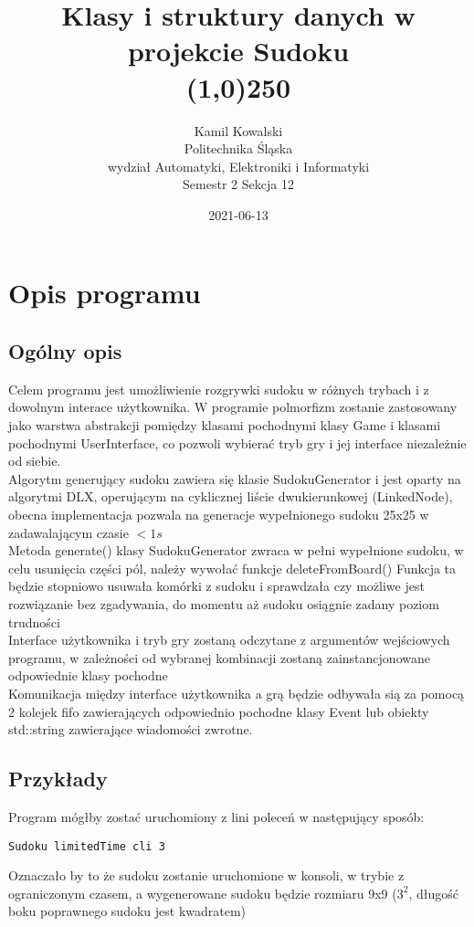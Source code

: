 \let\mypdfximage\pdfximage\def\pdfximage{\immediate\mypdfximage}\documentclass[a4paper,12pt]{book}
\title{Klasy i struktury danych w projekcie Sudoku\\ \line(1,0){250}}
\date{2021-06-13}
\author{Kamil Kowalski\\
Politechnika Śląska \\wydział Automatyki, Elektroniki i Informatyki \\ Semestr 2 Sekcja 12}
\newcommand{\+}{\discretionary{\mbox{\scriptsize$\hookleftarrow$}}{}{}}
\begin{document}
\raggedbottom

\maketitle


\chapter{Opis programu}
\section{Ogólny opis}
Celem programu jest umożliwienie rozgrywki sudoku w różnych trybach i z dowolnym interace użytkownika. 
W programie polmorfizm zostanie zastosowany jako warstwa abstrakcji pomiędzy klasami pochodnymi klasy Game i
klasami pochodnymi UserInterface, co pozwoli wybierać tryb gry i jej interface niezależnie od siebie.\\
Algorytm generujący sudoku zawiera się klasie SudokuGenerator i jest oparty na algorytmi DLX, operującym na cyklicznej liście dwukierunkowej (LinkedNode), obecna implementacja pozwala na generacje wypełnionego sudoku 25x25
w zadawalającym czasie $< 1s$ \\
Metoda generate() klasy SudokuGenerator zwraca w pełni wypełnione sudoku, w celu usunięcia części pól, należy wywołać funkcje deleteFromBoard()
Funkcja ta będzie stopniowo usuwała komórki z sudoku i sprawdzała czy możliwe jest rozwiązanie bez zgadywania, do momentu aż sudoku osiągnie zadany poziom trudności\\
Interface użytkownika i tryb gry zostaną odczytane z argumentów wejściowych programu, w zależności od wybranej kombinacji zostaną zainstancjonowane odpowiednie klasy pochodne \\
Komunikacja między interface użytkownika a grą będzie odbywała sią za pomocą 2 kolejek fifo zawierających odpowiednio pochodne klasy Event lub obiekty std::string zawierające 
wiadomości zwrotne.\\
\section{Przykłady}
Program mógłby zostać uruchomiony z lini poleceń w następujący sposób:
\begin{verbatim}
Sudoku limitedTime cli 3
\end{verbatim}
Oznaczało by to że sudoku zostanie uruchomione w konsoli, w trybie z ograniczonym czasem,
a wygenerowane sudoku będzie rozmiaru 9x9 ($3^2$, długość boku poprawnego sudoku jest kwadratem)
\end{document}
